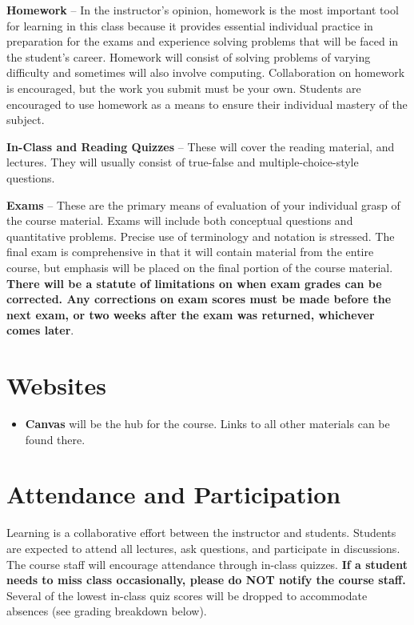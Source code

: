 \documentclass[9pt]{article}
\begin{document}
\textbf{Homework} -- In the instructor's opinion, homework is the most important tool for learning in this class because it provides essential individual practice in preparation for the exams and experience solving problems that will be faced in the student's career. Homework will consist of
solving problems of varying difficulty and sometimes will also involve
computing. Collaboration on homework is encouraged, but the work you submit must be your own. Students are encouraged to use homework as a means to ensure
their individual mastery of the subject.

\textbf{In-Class and Reading Quizzes} -- These will cover the reading material, and
lectures.  They will usually consist of true-false and multiple-choice-style questions.

\textbf{Exams} -- These are the primary means of evaluation of your
individual grasp of the course material. Exams will include both conceptual questions and
quantitative problems. Precise use of terminology and notation is
stressed. The final exam is comprehensive in that it will contain
material from the entire course, but emphasis will be placed on the
final portion of the course material. \textbf{There will
be a statute of limitations on when exam grades can be corrected. Any
corrections on exam scores must be made before the next exam, or two
weeks after the exam was returned, whichever comes later}.

\section*{Websites}

\begin{itemize}[nosep]
    \item \textbf{Canvas} will be the hub for the course. Links to all other materials can be found there.
\end{itemize}

\section*{Attendance and Participation}

Learning is a collaborative effort between the instructor and students. Students are expected to attend all lectures, ask questions, and participate in discussions. The course staff will encourage attendance through in-class quizzes. \textbf{If a student needs to miss class occasionally, please do NOT notify the course staff.} Several of the lowest in-class quiz scores will be dropped to accommodate absences (see grading breakdown below).
\end{document}
